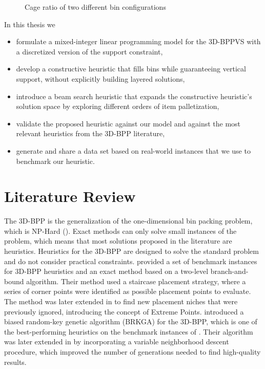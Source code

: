 \documentclass[11pt,a4paper,twocolumn]{article}
\begin{document}
\begin{figure}[h]
    \resizebox{\columnwidth}{!}{%
    
    }
    \caption{Cage ratio of two different bin configurations}
    \label{fig:cage_ratio}
\end{figure}

In this thesis we
\begin{itemize}
    \item formulate a mixed-integer linear programming model for the 3D-BPPVS with a discretized version of the support constraint,
    \item develop a constructive heuristic that fills bins while guaranteeing vertical support, without explicitly building layered solutions,
    \item introduce a beam search heuristic that expands the constructive heuristic's solution space by exploring different orders of item palletization,
    \item validate the proposed heuristic against our model and against the most relevant heuristics from the 3D-BPP literature,
    \item generate and share a data set based on real-world instances that we use to benchmark our heuristic.
\end{itemize}

\section{Literature Review}
The 3D-BPP is the generalization of the one-dimensional bin packing problem, which is NP-Hard (\cite{martello2000three}).
Exact methods can only solve small instances of the problem, which means that most solutions proposed in the literature are heuristics.
Heuristics for the 3D-BPP are designed to solve the standard problem and do not consider practical constraints.
\cite{martello2000three} provided a set of benchmark instances for 3D-BPP heuristics and an exact method based on a two-level branch-and-bound algorithm.
Their method used a staircase placement strategy, where a series of corner points were identified as possible placement points to evaluate.
The method was later extended in \cite{crainic2008extreme} to find new placement niches that were previously ignored, introducing the concept of Extreme Points.
\cite{gonccalves2013biased} introduced a biased random-key genetic algorithm (BRKGA) for the 3D-BPP, which is one of the best-performing heuristics on the benchmark instances of \cite{martello2000three}.
Their algorithm was later extended in \cite{zudio2018brkga} by incorporating a variable neighborhood descent procedure, which improved the number of generations needed to find high-quality results.
\end{document}
